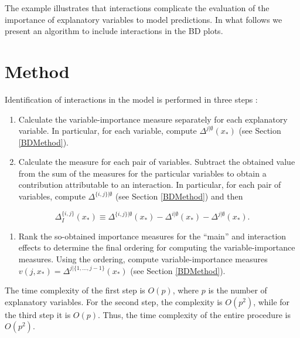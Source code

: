 \documentclass[]{krantz}
\providecommand{\tightlist}{%
  \setlength{\itemsep}{0pt}\setlength{\parskip}{0pt}}
\begin{document}
The example illustrates that interactions complicate the evaluation of the importance of explanatory variables to model predictions. In what follows we present an algorithm to include interactions in the BD plots.

\hypertarget{iBDMethod}{%
\section{Method}\label{iBDMethod}}

Identification of interactions in the model is performed in three steps \citep{iBreakDownRPackage}:

\begin{enumerate}
\def\labelenumi{\arabic{enumi}.}
\tightlist
\item
  Calculate the variable-importance measure separately for each explanatory variable. In particular, for each variable, compute \(\Delta^{j|\emptyset}(x_*)\) (see Section \ref{BDMethod}).
\item
  Calculate the measure for each pair of variables. Subtract the obtained value from the sum of the measures for the particular variables to obtain a contribution attributable to an interaction. In particular, for each pair of variables, compute \(\Delta^{\{i,j\}|\emptyset}\) (see Section \ref{BDMethod}) and then
\end{enumerate}

\begin{equation}
\Delta^{\{i,j\}}_I(x_*) \equiv \Delta^{\{i,j\}|\emptyset}(x_*)-\Delta^{i|\emptyset}(x_*)-\Delta^{j|\emptyset}(x_*).
\label{eq:deltaBreakDownInteractions}
\end{equation}

\begin{enumerate}
\def\labelenumi{\arabic{enumi}.}
\setcounter{enumi}{2}
\tightlist
\item
  Rank the so-obtained importance measures for the ``main'' and interaction effects to determine the final ordering for computing the variable-importance measures. Using the ordering, compute variable-importance measures \(v(j, x_*) = \Delta^{j|\{1, ..., j-1\}}(x_*)\) (see Section \ref{BDMethod}).
\end{enumerate}

The time complexity of the first step is \(O(p)\), where \(p\) is the number of explanatory variables. For the second step, the complexity is \(O(p^2)\), while for the third step it is \(O(p)\). Thus, the time complexity of the entire procedure is \(O(p^2)\).
\end{document}
